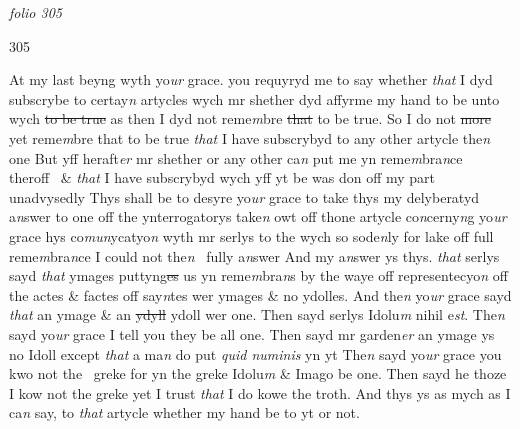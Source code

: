 \documentclass[12pt, a4paper]{book}
\begin{document}
\textit{folio 305}



            		\begin{flushright}{\color{Mahogany}305}\end{flushright}


		\ifthenelse{\isodd{\thepage}}
		{\reversemarginpar}
		{\normalmarginpar}
		At my last beyng wyth yo\textit{ur} grace. you requyryd me to say whether \textit{that} I dyd
subscrybe to certay\textit{n} artycles wych mr shether dyd affyrme my hand to be unto
wych \sout{to be true} as then I dyd not reme\textit{m}bre \sout{that }to be true. So I do not \sout{more }yet
reme\textit{m}bre that to be true \textit{that} I have subscrybyd to any other artycle the\textit{n} one
But yff heraft\textit{er} mr shether or any other ca\textit{n} put me yn reme\textit{m}bra\textit{n}ce theroff  
\& \textit{that} I have subscrybyd wych yff yt be was don off my part unadvysedly
Thys shall be to desyre yo\textit{ur} grace to take thys my delyberatyd a\textit{n}swer to one
off the ynterrogatorys take\textit{n} owt off thone artycle co\textit{n}cerny\textit{n}g yo\textit{ur }grace hys co\textit{mun}ycatyo\textit{n
}wyth mr serlys to the wych so sode\textit{n}ly for lake off full reme\textit{m}bra\textit{n}ce I could not the\textit{n} 
fully a\textit{n}swer And my a\textit{n}swer ys thys. \textit{that} serlys sayd \textit{that} ymages puttyng\sout{es} us yn
reme\textit{m}bra\textit{n}s by the waye off representecyo\textit{n} off the actes \& factes off say\textit{n}tes wer
ymages \& no ydolles. And the\textit{n} yo\textit{ur} grace sayd \textit{that} an ymage \& an \sout{ydyll }ydoll
wer one. Then sayd serlys Idolu\textit{m} nihil e\textit{st}. The\textit{n} sayd yo\textit{ur }grace I tell you
they be all one. Then sayd mr garden\textit{er} an ymage ys no Idoll except 
\textit{that} a ma\textit{n} do put \textit{quid numinis} yn yt The\textit{n} sayd yo\textit{ur} grace you kwo not the 
greke for yn the greke Idolu\textit{m} \& Imago be one. Then sayd he thoze I kow
not the greke yet I trust \textit{that} I do kowe the troth. And thys ys as mych as
I ca\textit{n} say, to \textit{that} artycle whether my hand be to yt or not.  
\end{document}
